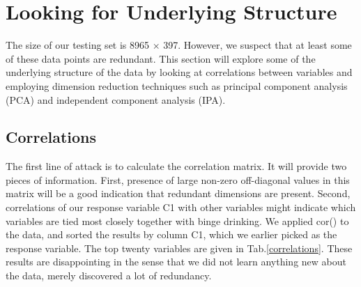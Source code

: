 \section{Looking for Underlying Structure}
\label{sec:PCA}
The size of our testing set is 8965 $\times$ 397. However, we suspect that at least some of these data points are redundant. This section will explore some of the underlying structure of the data by looking at correlations between variables and employing dimension reduction techniques such as principal component analysis (PCA) and independent component analysis (IPA). 
\subsection{Correlations}
The first line of attack is to calculate the correlation matrix. It will provide two pieces of information. First, presence of large non-zero off-diagonal values in this matrix will be a good indication that redundant dimensions are present. Second, correlations of our response variable C1 with other variables might indicate which variables are tied most closely together with binge drinking. We applied cor() to the data, and sorted the results by column C1, which we earlier picked as the response variable. The top twenty variables are given in Tab.\ref{correlations}. These results are disappointing in the sense that we did not learn anything new about the data, merely discovered a lot of redundancy. 

